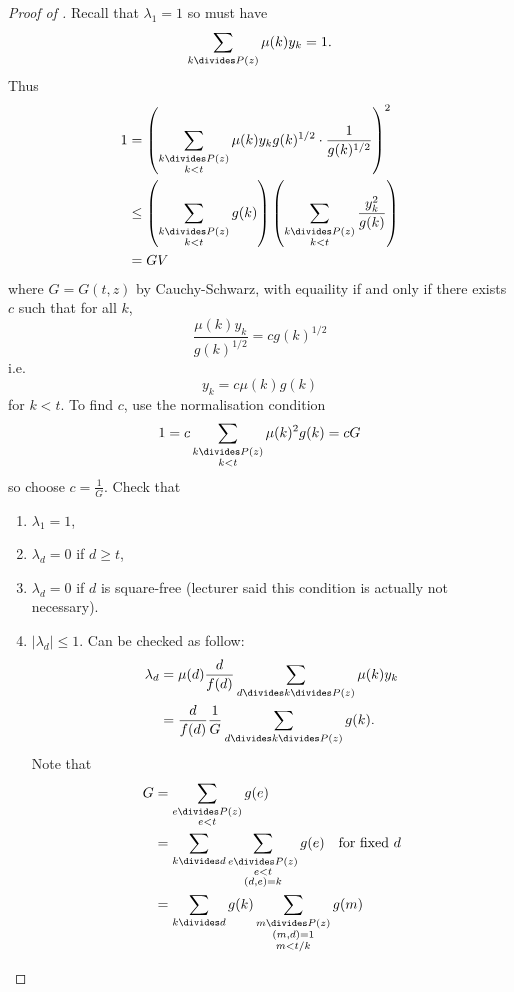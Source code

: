 \documentclass[a4paper]{article}
\theoremstyle{definition}
\begin{document}
\begin{proof}[Proof of ]
  Recall that \(\lambda_1 = 1\) so must have
  \[
    \sum_{k \divides P(z)} \mu(k) y_k = 1.
  \]
  Thus
  \begin{align*}
    1
    &= \left( \sum_{\substack{k \divides P(z) \\ k < t}} \mu(k) y_k g(k)^{1/2} \cdot \frac{1}{g(k)^{1/2}} \right)^2 \\
    &\leq \left( \sum_{\substack{k \divides P(z) \\ k < t}} g(k) \right) \left( \sum_{\substack{k \divides P(z) \\ k < t}} \frac{y_k^2}{g(k)} \right) \\
    &= GV
  \end{align*}
  where \(G = G(t, z)\) by Cauchy-Schwarz, with equaility if and only if there exists \(c\) such that for all \(k\),
  \[
    \frac{\mu(k) y_k}{g(k)^{1/2}} = c g(k)^{1/2}
  \]
  i.e.
  \[
    y_k = c \mu(k) g(k)
  \]
  for \(k < t\). To find \(c\), use the normalisation condition
  \[
    1 = c \sum_{\substack{k \divides P(z) \\ k < t}} \mu(k)^2 g(k) = cG
  \]
  so choose \(c = \frac{1}{G}\). Check that
  \begin{enumerate}
  \item \(\lambda_1 = 1\),
  \item \(\lambda_d = 0\) if \(d \geq t\),
  \item \(\lambda_d = 0\) if \(d\) is square-free (lecturer said this condition is actually not necessary).
  \item \(|\lambda_d| \leq 1\). Can be checked as follow:
    \begin{align*}
      \lambda_d
      &= \mu(d) \frac{d}{f(d)} \sum_{d \divides k \divides P(z)} \mu(k) y_k \\
      &= \frac{d}{f(d)} \frac{1}{G} \sum_{d \divides k \divides P(z)} g(k).
    \end{align*}
    Note that
    \begin{align*}
      G
      &= \sum_{\substack{e \divides P(z) \\ e < t}} g(e) \\
      &= \sum_{k \divides d} \sum_{\substack{e \divides P(z) \\ e < t \\ (d, e) = k}} g(e) \quad \text{for fixed \(d\)} \\
      &= \sum_{k \divides d} g(k) \sum_{\substack{m \divides P(z) \\ (m, d) = 1 \\ m < t/k}} g(m) \\

\end{align*}
\end{enumerate}
\end{proof}
\end{document}
